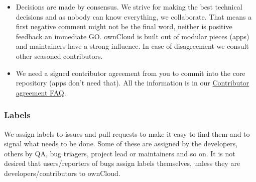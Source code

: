 \documentclass[letterpaper,10pt,english]{sphinxmanual}
\begin{document}
\begin{itemize}
\item {} 
Decisions are made by consensus. We strive for making the best technical decisions and as nobody can know everything, we collaborate. That means a first negative comment might not be the final word, neither is positive feedback an immediate GO. ownCloud is built out of modular pieces (apps) and maintainers have a strong influence. In case of disagreement we consult other seasoned contributors.

\item {} 
We need a signed contributor agreement from you to commit into the core repository (apps don't need that). All the information is in our \href{https://owncloud.org/contribute/agreement/}{Contributor agreement FAQ}.

\end{itemize}


\subsubsection{Labels}
\label{general/codingguidelines:labels}
We assign labels to issues and pull requests to make it easy to find them and to signal what needs to be done. Some of these are assigned by the developers, others by QA, bug triagers, project lead or maintainers and so on. It is not desired that users/reporters of bugs assign labels themselves, unless they are developers/contributors to ownCloud.
\end{document}
